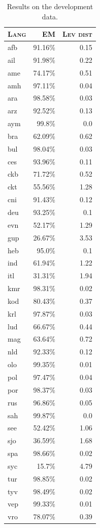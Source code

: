 \documentclass[11pt,a4paper]{article}
\begin{document}
\begin{table}[ht!]
\centering
\begin{tabular}{lrr}
\textsc{Lang} & \textsc{EM} & \textsc{Lev dist}  \\
  \hline
  afb & 91.16\% & 0.15 \\
  ail & 91.98\% & 0.22 \\
  ame & 74.17\% & 0.51 \\
  amh & 97.11\% & 0.04 \\
  ara & 98.58\% & 0.03 \\
  arz & 92.52\% & 0.13 \\
  aym & 99.8\% & 0.0 \\
  bra & 62.09\% & 0.62 \\
  bul & 98.04\% & 0.03 \\
  ces & 93.96\% & 0.11 \\
  ckb & 71.72\% & 0.52 \\
  ckt & 55.56\% & 1.28 \\
  cni & 91.43\% & 0.12 \\
  deu & 93.25\% & 0.1 \\
  evn & 52.17\% & 1.29 \\
  gup & 26.67\% & 3.53 \\
  heb & 95.0\% & 0.1 \\
  ind & 61.94\% & 1.22 \\
  itl & 31.31\% & 1.94 \\
  kmr & 98.31\% & 0.02 \\
  kod & 80.43\% & 0.37 \\
  krl & 97.87\% & 0.03 \\
  lud & 66.67\% & 0.44 \\
  mag & 63.64\% & 0.72 \\
  nld & 92.33\% & 0.12 \\
  olo & 99.35\% & 0.01 \\
  pol & 97.47\% & 0.04 \\
  por & 98.37\% & 0.03 \\
  rus & 96.86\% & 0.05 \\
  sah & 99.87\% & 0.0 \\
  see & 52.42\% & 1.06 \\
  sjo & 36.59\% & 1.68 \\
  spa & 98.66\% & 0.02 \\
  syc & 15.7\% & 4.79 \\
  tur & 98.85\% & 0.02 \\
  tyv & 98.49\% & 0.02 \\
  vep & 99.33\% & 0.01 \\
  vro & 78.07\% & 0.39 \\
\end{tabular} 
\caption{Results on the development data.}
\label{tab:accuracy-dev}
\end{table}
\end{document}
